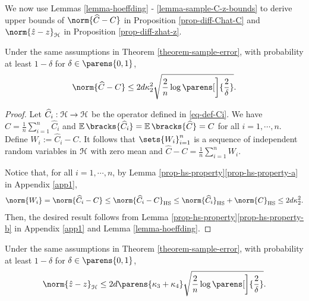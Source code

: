 We now use Lemmas \ref{lemma-hoeffding} - \ref{lemma-sample-C-z-bounds} to derive upper bounds of $\norm{\widehat{C} - C}$ in Proposition \ref{prop-diff-Chat-C} and $\norm{\hat{z} - z}_{\hil}$ in Proposition \ref{prop-diff-zhat-z}. 

\begin{proposition}\label{prop-diff-Chat-C}
	Under the same assumptions in Theorem \ref{theorem-sample-error}, with probability at least $1 - \delta$ for $\delta \in \parens{0, 1}$, 
	\begin{align*}
		\norm{\widehat{C} - C} \le 2d \kappa_2^2 \sqrt{\frac{2}{n} \log \parens[\bigg]{\frac{2}{\delta}}}. 
	\end{align*}
\end{proposition}

\begin{proof}
	Let $\widehat{C}_i: \mathcal{H} \to \mathcal{H}$ be the operator defined in \eqref{eq-def-Ci}. We have $\widehat{C} = \frac{1}{n} \sum_{i=1}^n \widehat{C}_i$ and $\E \bracks{\widehat{C}_i} = \E \bracks{\widehat{C}} = C$ for all $i = 1, \cdots, n$. Define $W_i := \widehat{C}_i - C$. It follows that $\sets{W_i}_{i=1}^n$ is a sequence of independent random variables in $\mathcal{H}$ with zero mean and $\widehat{C} - C = \frac{1}{n} \sum_{i=1}^n W_i$. 
	
	Notice that, for all $i = 1, \cdots, n$, by Lemma \ref{prop-hs-property}\ref{prop-hs-property-a} in Appendix \ref{app1}, 
	\begin{align*}
		\norm{W_i} = \norm{\widehat{C}_i - C} \le \norm{\widehat{C}_i - C}_{\mathrm{HS}} \le \norm{\widehat{C}_i}_{\mathrm{HS}} + \norm{C}_{\mathrm{HS}} \le 2 d \kappa_2^2. 
	\end{align*}
	Then, the desired result follows from Lemma \ref{prop-hs-property}\ref{prop-hs-property-b} in Appendix \ref{app1} and Lemma \ref{lemma-hoeffding}. 
\end{proof}

\begin{proposition}\label{prop-diff-zhat-z}
	Under the same assumptions in Theorem \ref{theorem-sample-error}, with probability at least $1 - \delta$ for $\delta \in \parens{0, 1}$, 
	\begin{align*}
		\norm{\hat{z} - z}_{\hil} \le 2d \parens{\kappa_3 + \kappa_4} \sqrt{\frac{2}{n} \log \parens[\bigg]{\frac{2}{\delta}}}. 
	\end{align*}
\end{proposition}

